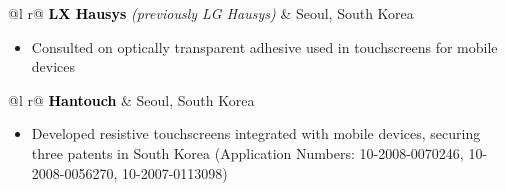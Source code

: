 \documentclass[letterpaper,9pt]{article}
\begin{document}
\vspace{-2mm}

\begin{tabularx}{\linewidth}{ @{}l r@{} }
\textcolor{Black}{\textbf{LX Hausys}} \textit{(previously LG Hausys)} & \hfill Seoul, South Korea \\[2pt]
\end{tabularx}
\vspace{-1em}
\begin{itemize}[nosep,after=\strut, leftmargin=1em, itemsep=2pt]
    \item Consulted on optically transparent adhesive used in touchscreens for mobile devices
\end{itemize}

\vspace{-2mm}

\begin{tabularx}{\linewidth}{ @{}l r@{} }
\textcolor{Black}{\textbf{Hantouch}} & \hfill Seoul, South Korea \\[1pt]
\end{tabularx}
\vspace{-1em}
\begin{itemize}[nosep,after=\strut, leftmargin=1em, itemsep=2pt]
    \item Developed resistive touchscreens integrated with  mobile devices, securing three patents in South Korea (Application Numbers: 10-2008-0070246, 10-2008-0056270, 10-2007-0113098)
\end{itemize}
\vspace{-2mm}
\end{document}
